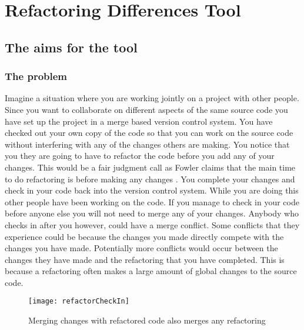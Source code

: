 
\chapter{Refactoring Differences Tool}

\section{The aims for the tool}
\subsection{The problem}
Imagine a situation where you are working jointly on a project with other people. Since you want to collaborate on different aspects of the same source code you have set up the project in a merge based version control system.  You have checked out your own copy of the code so that you can work on the source code without interfering with any of the changes others are making. You notice that you they are going to have to refactor the code before you add any of your changes.  This would be a fair judgment call as Fowler claims that the main time to do refactoring is before making any changes \cite{Fowler1999}. You complete your changes and check in your code back into the version control system.  While you are doing this other people have been working on the code.  If you manage to check in your code before anyone else you will not need to merge any of your changes.  Anybody who checks in after you however, could have a merge conflict.  Some conflicts that they experience could be because the changes you made directly compete with the changes you have made. Potentially more conflicts would occur between the changes they have made and the refactoring that you have completed. This is because a refactoring often makes a large amount of global changes to the source code.

\begin{figure}
\begin{center}
\texttt{[image: refactorCheckIn]}
\end{center}
\caption{Merging changes with refactored code also merges any refactoring}
\end{figure}

